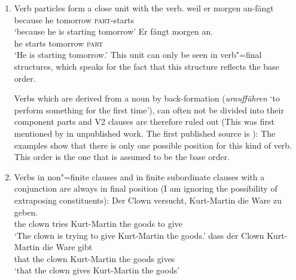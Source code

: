 \begin{enumerate}
\item Verb particles form a close unit with the verb.
\eal
\ex 
\gll weil er morgen an-fängt\\
     because he tomorrow \textsc{part}-starts\\
\glt `because he is starting tomorrow'
\ex 
\gll Er fängt morgen an.\\
	 he starts tomorrow \textsc{part}\\
\glt `He is starting tomorrow.'
\zl
This unit can only be seen in verb"=final structures, which speaks for the fact that this structure
reflects the base order.

Verbs which are derived from a noun by back-formation (\eg \emph{uraufführen} 
`to perform something for the first time'), can often not be divided into their component parts and
V2 clauses are therefore ruled out (This was first mentioned by \citet{Hoehle91b} in unpublished
work. The first published source is ):
\eal
{}
\zl
The examples show that there is only one possible position for this kind of verb. This order is the one that is assumed to be the base order.
\item Verbs in non"=finite clauses and in finite subordinate clauses with a conjunction are
always in final position (I am ignoring the possibility of extraposing constituents):
\eal
\ex 
\gll Der Clown versucht, Kurt-Martin die Ware zu geben.\\
     the clown tries Kurt-Martin the goods to give\\
\glt `The clown is trying to give Kurt-Martin the goods.'
\ex 
\gll dass der Clown Kurt-Martin die Ware gibt\\
	 that the clown Kurt-Martin the goods gives\\
\glt `that the clown gives Kurt-Martin the goods'
\zl


\end{enumerate}
